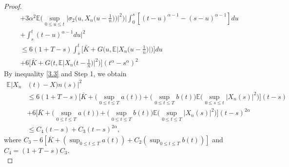 \documentclass[a4 paper, 12pt]{report}
\theoremstyle{plain}
\begin{document}
\begin{proof}
\begin{align*}
&+3\alpha^2\mathbb{E}\bigg(\sup_{0\leq u\leq t}\bigg|\sigma_2\bigg(u,X_n\bigg(u - \frac{1}{n}\bigg)\bigg)\bigg|^2\bigg)\bigg|\int_0^s[(t-u)^{\alpha - 1}-(s-u)^{\alpha - 1}]du\\
&+\int_s^t(t - u)^{\alpha - 1}du\bigg|^2\\
&\leq 6(1+T - s)\int_s^t\bigg[\bar{K}+G\bigg(u,\mathbb{E}\bigg|X_n\bigg(u - \frac{1}{n}\bigg)\bigg|\bigg)\bigg]du\\
&+6\bigg[\bar{K}+G\bigg(t,\mathbb{E}\bigg|X_n\bigg(t - \frac{1}{n}\bigg)\bigg|^2\bigg)\bigg](t^\alpha - s^\alpha)^2
\end{align*}
By inequality \eqref{3.3} and Step 1, we obtain
\begin{align*}
\mathbb{E}|X_n&(t) - X)n(s)|^2\\
&\leq 6(1+T-s)\bigg[\bar{K}+\bigg(\sup_{0\leq t\leq T}a(t)\bigg)+\bigg(\sup_{0\leq t\leq T}b(t)\bigg)\mathbb{E}\bigg(\sup_{0\leq s\leq t}|X_n(s)|^2\bigg)\bigg](t-s)\\
&+6\bigg[\bar{K}+\bigg(\sup_{0\leq t\leq T}a(t)\bigg)+\bigg(\sup_{0\leq t\leq T}b(t)\bigg)\mathbb{E}\bigg(\sup_{0\leq t\leq T}|X_n(s)|^2\bigg)\bigg](t-s)^{2\alpha}\\
&\leq C_4(t-s)+C_3(t-s)^{2\alpha},
\end{align*}
where $C_3 - 6[\bar{K}+(\sup_{0\leq t\leq T}a(t))+C_2(\sup_{0\leq t\leq T}b(t))]$ and $C_4 = (1 + T - s)C_3$.\\


\end{proof}
\end{document}
